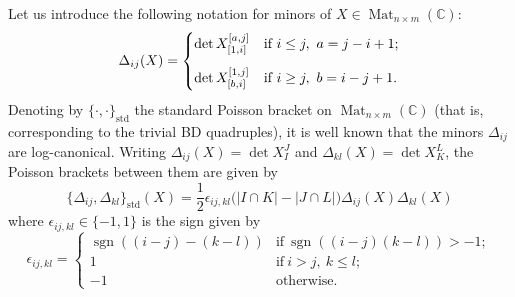 \documentclass[11pt]{article}
\newcommand{\std}{\mathrm{std}}
\DeclareMathOperator{\Mat}{Mat}
\DeclareMathOperator{\sgn}{sgn}
\theoremstyle{definition}\newtheorem{definition}[theorem]{Definition}
\theoremstyle{definition}\newtheorem{remark}[theorem]{Remark}
\theoremstyle{remark}
\numberwithin{equation}{section}
\begin{document}
Let us introduce the following notation for minors of $X \in \Mat_{n\times m}(\mathbb{C})$:
\begin{equation*}
    \Delta_{ij}(X) = \begin{dcases}
        \det X_{[1,i]}^{[a,j]} &\text{if}\ i \leq j, \ a = j-i+1;\\[5pt]
        \det X_{[b,i]}^{[1,j]} &\text{if}\ i \geq j, \ b = i-j+1.
    \end{dcases}
\end{equation*}
Denoting by $\{\cdot,\cdot\}_{\std}$ the standard Poisson bracket on $\Mat_{n\times m}(\mathbb{C})$ (that is, corresponding to the trivial BD quadruples), it is well known that the minors $\Delta_{ij}$ are log-canonical. Writing $\Delta_{ij}(X) = \det X_{I}^J$ and $\Delta_{kl}(X) = \det X_{K}^L$, the Poisson brackets between them are given by
\begin{equation}\label{eq:bracket}
    \{\Delta_{ij},\Delta_{kl}\}_{\std}(X) = \frac{1}{2}\epsilon_{ij,kl} \big( |I\cap K| - |J \cap L|\big)\Delta_{ij}(X)\Delta_{kl}(X)
\end{equation}
where $\epsilon_{ij,kl} \in \{-1,1\}$ is the sign given by 
\begin{equation*}
    \epsilon_{ij,kl} = \begin{cases}
        \sgn((i-j)-(k-l)) & \text{if} \ \sgn((i-j)(k-l))> -1;\\
        1 & \text{if}\ i > j, \ k \leq l;\\
        -1 &\text{otherwise.}
    \end{cases}
\end{equation*}
\end{document}
